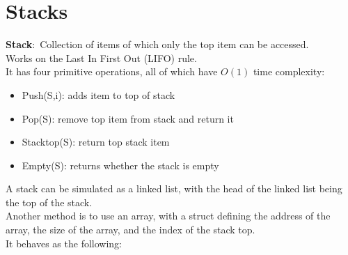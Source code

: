 \documentclass[nobib]{tufte-handout}
\newcommand{\defn}[2]{\noindent\textbf{#1}:\ #2}
\begin{document}
\section{Stacks}
\defn{Stack}{Collection of items of which only the top item can be accessed.}\\
Works on the Last In First Out (LIFO) rule.\\
It has four primitive operations, all of which have $O(1)$ time complexity:
\begin{itemize}
    \item Push(S,i): adds item to top of stack
    \item Pop(S): remove top item from stack and return it
    \item Stacktop(S): return top stack item
    \item Empty(S): returns whether the stack is empty
\end{itemize}
A stack can be simulated as a linked list, with the head of the linked list being the top of the stack.\\
Another method is to use an array, with a struct defining the address of the array, the size of the array, and the index of the stack top.\\
It behaves as the following:\\
\end{document}
